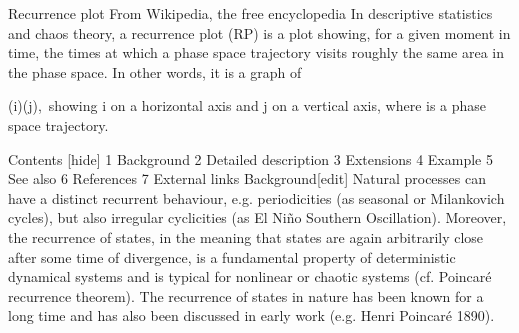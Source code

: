 Recurrence plot
From Wikipedia, the free encyclopedia
In descriptive statistics and chaos theory, a recurrence plot (RP) is a plot showing, for a given moment in time, the times at which a phase space trajectory visits roughly the same area in the phase space. In other words, it is a graph of

(i)\approx {}(j),\,
showing i on a horizontal axis and j on a vertical axis, where  is a phase space trajectory.

Contents  [hide] 
1	Background
2	Detailed description
3	Extensions
4	Example
5	See also
6	References
7	External links
Background[edit]
Natural processes can have a distinct recurrent behaviour, e.g. periodicities (as seasonal or Milankovich cycles), but also irregular cyclicities (as El Niño Southern Oscillation). Moreover, the recurrence of states, in the meaning that states are again arbitrarily close after some time of divergence, is a fundamental property of deterministic dynamical systems and is typical for nonlinear or chaotic systems (cf. Poincaré recurrence theorem). The recurrence of states in nature has been known for a long time and has also been discussed in early work (e.g. Henri Poincaré 1890).
